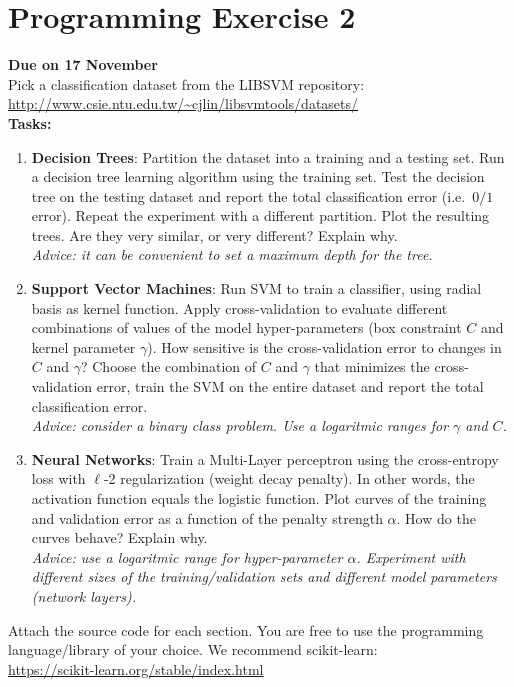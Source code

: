 \documentclass{article}
\begin{document}
  \section*{Programming Exercise 2}

  {\bf Due on 17 November}\\

  Pick a classification dataset from the LIBSVM repository:\\

  \url{http://www.csie.ntu.edu.tw/~cjlin/libsvmtools/datasets/}\\

  \noindent
  {\bf Tasks:}

  \begin{enumerate}
  \item \textbf{Decision Trees}: Partition the dataset into a training and a testing set. Run a decision tree learning algorithm using the training set. Test the decision tree on the testing dataset and report the total classification error (i.e.~$0/1$ error). Repeat the experiment with a different partition. Plot the resulting trees. Are they very similar, or very different? Explain why.\\ \emph{Advice: it can be convenient to set a maximum depth for the tree.}
  \item \textbf{Support Vector Machines}: Run SVM to train a classifier, using radial basis as kernel function. Apply cross-validation to evaluate different combinations of values of the model hyper-parameters (box constraint $C$ and kernel parameter $\gamma$). How sensitive is the cross-validation error to changes in $C$ and $\gamma$? Choose the combination of $C$ and $\gamma$ that minimizes the cross-validation error, train the SVM on the entire dataset and report the total classification error.\\
\emph{Advice: consider a binary class problem. Use a logaritmic ranges for $\gamma$ and $C$.}
  \item \textbf{Neural Networks}: Train a Multi-Layer perceptron using the cross-entropy loss with $\ell$-2 regularization (weight decay penalty). In other words, the activation function equals the logistic function. Plot curves of the training and validation error as a function of the penalty strength $\alpha$.
 How do the curves behave? Explain why.\\
\emph{Advice: use a logaritmic range for hyper-parameter $\alpha$. Experiment with different sizes of the training/validation sets and different model parameters (network layers).}
  \end{enumerate}

  Attach the source code for each section. You are free to use the programming language/library of your choice.
	We recommend scikit-learn:\\

 \url{https://scikit-learn.org/stable/index.html}
\end{document}

